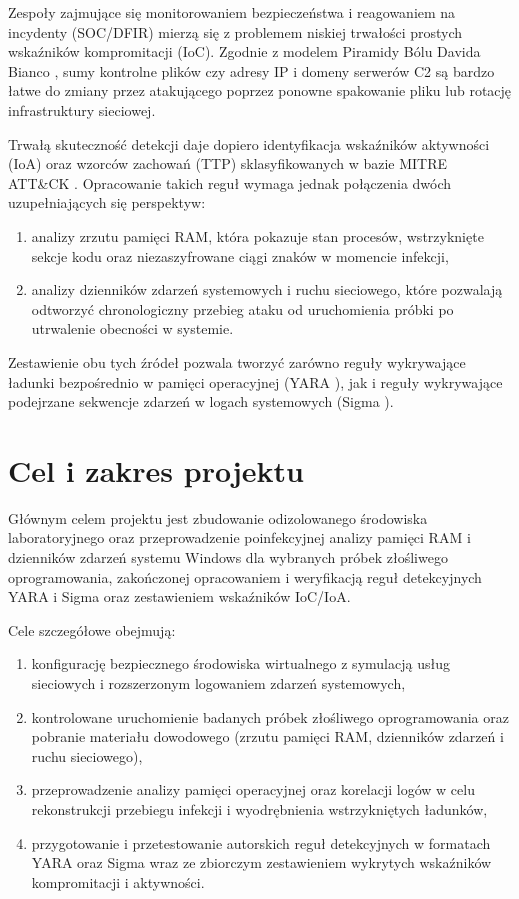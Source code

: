 Zespoły zajmujące się monitorowaniem bezpieczeństwa i reagowaniem na incydenty (SOC/DFIR) mierzą się z problemem niskiej trwałości prostych wskaźników kompromitacji (IoC). Zgodnie z modelem Piramidy Bólu Davida Bianco \cite{bianco2013pyramid}, sumy kontrolne plików czy adresy IP i domeny serwerów C2 są bardzo łatwe do zmiany przez atakującego poprzez ponowne spakowanie pliku lub rotację infrastruktury sieciowej.

Trwałą skuteczność detekcji daje dopiero identyfikacja wskaźników aktywności (IoA) oraz wzorców zachowań (TTP) sklasyfikowanych w bazie MITRE ATT\&CK \cite{mitre_attack}. Opracowanie takich reguł wymaga jednak połączenia dwóch uzupełniających się perspektyw:
\begin{enumerate}
    \item analizy zrzutu pamięci RAM, która pokazuje stan procesów, wstrzyknięte sekcje kodu oraz niezaszyfrowane ciągi znaków w momencie infekcji,
    \item analizy dzienników zdarzeń systemowych i ruchu sieciowego, które pozwalają odtworzyć chronologiczny przebieg ataku od uruchomienia próbki po utrwalenie obecności w systemie.
\end{enumerate}

Zestawienie obu tych źródeł pozwala tworzyć zarówno reguły wykrywające ładunki bezpośrednio w pamięci operacyjnej (YARA \cite{yara_docs}), jak i reguły wykrywające podejrzane sekwencje zdarzeń w logach systemowych (Sigma \cite{sigma_hq}).

\section{Cel i zakres projektu}\label{sec:cele_projektu}

Głównym celem projektu jest zbudowanie odizolowanego środowiska laboratoryjnego oraz przeprowadzenie poinfekcyjnej analizy pamięci RAM i dzienników zdarzeń systemu Windows dla wybranych próbek złośliwego oprogramowania, zakończonej opracowaniem i weryfikacją reguł detekcyjnych YARA i Sigma oraz zestawieniem wskaźników IoC/IoA.

Cele szczegółowe obejmują:
\begin{enumerate}
    \item konfigurację bezpiecznego środowiska wirtualnego z symulacją usług sieciowych i rozszerzonym logowaniem zdarzeń systemowych,
    \item kontrolowane uruchomienie badanych próbek złośliwego oprogramowania oraz pobranie materiału dowodowego (zrzutu pamięci RAM, dzienników zdarzeń i ruchu sieciowego),
    \item przeprowadzenie analizy pamięci operacyjnej oraz korelacji logów w celu rekonstrukcji przebiegu infekcji i wyodrębnienia wstrzykniętych ładunków,
    \item przygotowanie i przetestowanie autorskich reguł detekcyjnych w formatach YARA oraz Sigma wraz ze zbiorczym zestawieniem wykrytych wskaźników kompromitacji i aktywności.
\end{enumerate}

